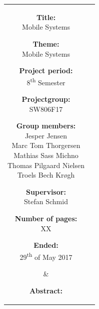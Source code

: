 \begin{titlepage}
\begin{nopagebreak}
{            \noindent
            \begin{tabular}{cc}
                \parbox[t]{.40\textwidth}{
                    \begin{description}
                        \item {\bf Title:}\\
                        Mobile Systems
                        \item {\bf Theme:}\\
                        Mobile Systems
                        \item {\bf Project period:}\\
                            8\textsuperscript{th} Semester
                            \hspace{4cm}
                        \item {\bf Projectgroup:}\\
                            SW806F17
                            \hspace{4cm}
                        \item {\bf Group members:}\\
                        Jesper Jensen \\
                        Marc Tom Thorgersen \\
                        Mathias Sass Michno \\
                        Thomas Pilgaard Nielsen \\
                        Troels Bech Krøgh
                        \item {\bf Supervisor:}\\
                            Stefan Schmid
                        \item {\bf Number of pages:}\\
                            XX
                        \item {\bf Ended:}\\
                            29\textsuperscript{th} of May 2017
                    \end{description}
                } &
                \parbox[t]{.45\textwidth}{
                        {\bf Abstract:}\bigskip \\
                }
            \end{tabular}
        }
    \end{nopagebreak}
\end{titlepage}
